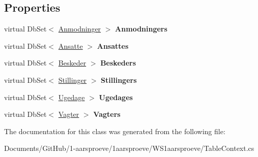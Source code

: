 \subsection*{Properties}
\begin{DoxyCompactItemize}
\item 
\hypertarget{class_w_s1aarsproeve_1_1_table_context_ade8a3cc374552a563cedd42e3a82d4a9}{}virtual Db\+Set$<$ \hyperlink{class_w_s1aarsproeve_1_1_anmodninger}{Anmodninger} $>$ {\bfseries Anmodningers}\label{class_w_s1aarsproeve_1_1_table_context_ade8a3cc374552a563cedd42e3a82d4a9}

\item 
\hypertarget{class_w_s1aarsproeve_1_1_table_context_a6341a67f517a0bbc44f0fb068c4b7178}{}virtual Db\+Set$<$ \hyperlink{class_w_s1aarsproeve_1_1_ansatte}{Ansatte} $>$ {\bfseries Ansattes}\label{class_w_s1aarsproeve_1_1_table_context_a6341a67f517a0bbc44f0fb068c4b7178}

\item 
\hypertarget{class_w_s1aarsproeve_1_1_table_context_a5ccb14602b884e3e7c6dce2b807e2d4a}{}virtual Db\+Set$<$ \hyperlink{class_w_s1aarsproeve_1_1_beskeder}{Beskeder} $>$ {\bfseries Beskeders}\label{class_w_s1aarsproeve_1_1_table_context_a5ccb14602b884e3e7c6dce2b807e2d4a}

\item 
\hypertarget{class_w_s1aarsproeve_1_1_table_context_a4892255183f924e549c6d71fe6df046b}{}virtual Db\+Set$<$ \hyperlink{class_w_s1aarsproeve_1_1_stillinger}{Stillinger} $>$ {\bfseries Stillingers}\label{class_w_s1aarsproeve_1_1_table_context_a4892255183f924e549c6d71fe6df046b}

\item 
\hypertarget{class_w_s1aarsproeve_1_1_table_context_a11f7dc9477816840e89a32cc595fc67b}{}virtual Db\+Set$<$ \hyperlink{class_w_s1aarsproeve_1_1_ugedage}{Ugedage} $>$ {\bfseries Ugedages}\label{class_w_s1aarsproeve_1_1_table_context_a11f7dc9477816840e89a32cc595fc67b}

\item 
\hypertarget{class_w_s1aarsproeve_1_1_table_context_a248f8738fc860dbf42457335a01636d5}{}virtual Db\+Set$<$ \hyperlink{class_w_s1aarsproeve_1_1_vagter}{Vagter} $>$ {\bfseries Vagters}\label{class_w_s1aarsproeve_1_1_table_context_a248f8738fc860dbf42457335a01636d5}

\end{DoxyCompactItemize}


The documentation for this class was generated from the following file\+:\begin{DoxyCompactItemize}
\item 
Documents/\+Git\+Hub/1-\/aarsproeve/1aarsproeve/\+W\+S1aarsproeve/Table\+Context.\+cs\end{DoxyCompactItemize}
